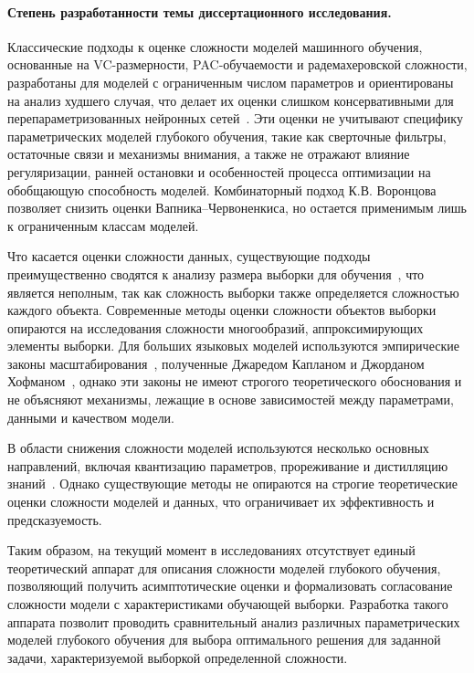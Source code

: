\paragraph{Степень разработанности темы диссертационного исследования.}
Классические подходы к оценке сложности моделей машинного обучения, основанные на VC-размерности, PAC-обучаемости и радемахеровской сложности, разработаны для моделей с ограниченным числом параметров и ориентированы на анализ худшего случая, что делает их оценки слишком консервативными для перепараметризованных нейронных сетей~\cite{macKay2003}.
Эти оценки не учитывают специфику параметрических моделей глубокого обучения, такие как сверточные фильтры, остаточные связи и механизмы внимания, а также не отражают влияние регуляризации, ранней остановки и особенностей процесса оптимизации на обобщающую способность моделей.
Комбинаторный подход К.В. Воронцова~\cite{vorontsov04qualdan} позволяет снизить оценки Вапника--Червоненкиса, но остается применимым лишь к ограниченным классам моделей.

Что касается оценки сложности данных, существующие подходы преимущественно сводятся к анализу размера выборки для обучения~\cite{motrenko2022numerical613055643, demidenko2007, joseph1997, joseph1995, kloek1975, lindley1997, motrenko2014, qumsiyeh2013, rubin1998, self1988, self1992, shieh2000, shieh2005, wang2002}, что является неполным, так как сложность выборки также определяется сложностью каждого объекта.
Современные методы оценки сложности объектов выборки опираются на исследования сложности многообразий, аппроксимирующих элементы выборки.
Для больших языковых моделей используются эмпирические законы масштабирования~\cite{hoffmann2022Chinchila,kaplan2020ScalingLaws}, полученные Джаредом Капланом и Джорданом Хофманом~\cite{rae2022scalinglanguagemodelsmethods}, однако эти законы не имеют строгого теоретического обоснования и не объясняют механизмы, лежащие в основе зависимостей между параметрами, данными и качеством модели.

В области снижения сложности моделей используются несколько основных направлений, включая квантизацию параметров, прореживание и дистилляцию знаний~\cite{hinton2015, lopez2016, grabovoi2021bayesian609999432}.
Однако существующие методы не опираются на строгие теоретические оценки сложности моделей и данных, что ограничивает их эффективность и предсказуемость.

Таким образом, на текущий момент в исследованиях отсутствует единый теоретический аппарат для описания сложности моделей глубокого обучения, позволяющий получить асимптотические оценки и формализовать согласование сложности модели с характеристиками обучающей выборки.
Разработка такого аппарата позволит проводить сравнительный анализ различных параметрических моделей глубокого обучения для выбора оптимального решения для заданной задачи, характеризуемой выборкой определенной сложности.

